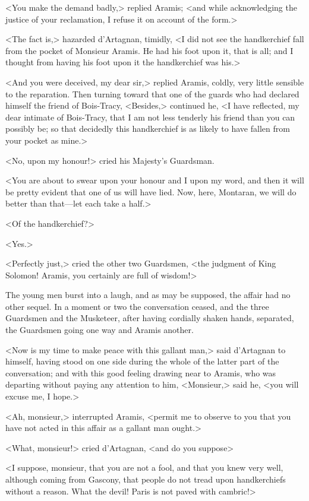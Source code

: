 <You make the demand badly,> replied Aramis; <and while acknowledging the justice of your reclamation, I refuse it on account of the form.> 

<The fact is,> hazarded d'Artagnan, timidly, <I did not see the handkerchief fall from the pocket of Monsieur Aramis. He had his foot upon it, that is all; and I thought from having his foot upon it the handkerchief was his.> 

<And you were deceived, my dear sir,> replied Aramis, coldly, very little sensible to the reparation. Then turning toward that one of the guards who had declared himself the friend of Bois-Tracy, <Besides,> continued he, <I have reflected, my dear intimate of Bois-Tracy, that I am not less tenderly his friend than you can possibly be; so that decidedly this handkerchief is as likely to have fallen from your pocket as mine.> 

<No, upon my honour!> cried his Majesty's Guardsman. 

<You are about to swear upon your honour and I upon my word, and then it will be pretty evident that one of us will have lied. Now, here, Montaran, we will do better than that---let each take a half.> 

<Of the handkerchief?> 

<Yes.> 

<Perfectly just,> cried the other two Guardsmen, <the judgment of King Solomon! Aramis, you certainly are full of wisdom!> 

The young men burst into a laugh, and as may be supposed, the affair had no other sequel. In a moment or two the conversation ceased, and the three Guardsmen and the Musketeer, after having cordially shaken hands, separated, the Guardsmen going one way and Aramis another. 

<Now is my time to make peace with this gallant man,> said d'Artagnan to himself, having stood on one side during the whole of the latter part of the conversation; and with this good feeling drawing near to Aramis, who was departing without paying any attention to him, <Monsieur,> said he, <you will excuse me, I hope.> 

<Ah, monsieur,> interrupted Aramis, <permit me to observe to you that you have not acted in this affair as a gallant man ought.> 

<What, monsieur!> cried d'Artagnan, <and do you suppose\longdash> 

<I suppose, monsieur, that you are not a fool, and that you knew very well, although coming from Gascony, that people do not tread upon handkerchiefs without a reason. What the devil! Paris is not paved with cambric!> 

